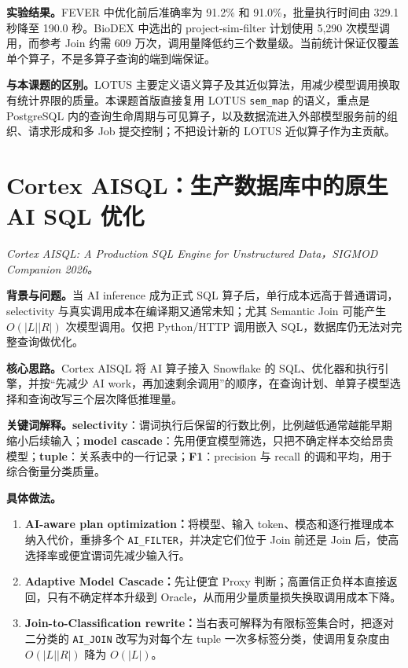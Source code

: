\documentclass[10pt,a4paper]{ctexart}
\let\digestoriginalsection\section
\renewcommand{\section}{\Needspace{7\baselineskip}\digestoriginalsection}
\newcommand{\paperinfo}[1]{\textit{#1}\par}
\newcommand{\field}[1]{\par\noindent\textbf{#1。}\hspace{0.25em}}
\begin{document}
\field{实验结果}FEVER 中优化前后准确率为 91.2\% 和 91.0\%，批量执行时间由 329.1 秒降至 190.0 秒。BioDEX 中选出的 project-sim-filter 计划使用 5,290 次模型调用，而参考 Join 约需 609 万次，调用量降低约三个数量级。当前统计保证仅覆盖单个算子，不是多算子查询的端到端保证。

\field{与本课题的区别}LOTUS 主要定义语义算子及其近似算法，用减少模型调用换取有统计界限的质量。本课题首版直接复用 LOTUS \texttt{sem\_map} 的语义，重点是 PostgreSQL 内的查询生命周期与可见算子，以及数据流进入外部模型服务前的组织、请求形成和多 Job 提交控制；不把设计新的 LOTUS 近似算子作为主贡献。

\section{Cortex AISQL：生产数据库中的原生 AI SQL 优化}
\paperinfo{Cortex AISQL: A Production SQL Engine for Unstructured Data，SIGMOD Companion 2026。}

\field{背景与问题}当 AI inference 成为正式 SQL 算子后，单行成本远高于普通谓词，selectivity 与真实调用成本在编译期又通常未知；尤其 Semantic Join 可能产生 $O(|L||R|)$ 次模型调用。仅把 Python/HTTP 调用嵌入 SQL，数据库仍无法对完整查询做优化。

\field{核心思路}Cortex AISQL 将 AI 算子接入 Snowflake 的 SQL、优化器和执行引擎，并按“先减少 AI work，再加速剩余调用”的顺序，在查询计划、单算子模型选择和查询改写三个层次降低推理量。

\field{关键词解释}\textbf{selectivity}：谓词执行后保留的行数比例，比例越低通常越能早期缩小后续输入；\textbf{model cascade}：先用便宜模型筛选，只把不确定样本交给昂贵模型；\textbf{tuple}：关系表中的一行记录；\textbf{F1}：precision 与 recall 的调和平均，用于综合衡量分类质量。

\field{具体做法}
\begin{enumerate}
  \item \textbf{AI-aware plan optimization：}将模型、输入 token、模态和逐行推理成本纳入代价，重排多个 \texttt{AI\_FILTER}，并决定它们位于 Join 前还是 Join 后，使高选择率或便宜谓词先减少输入行。
  \item \textbf{Adaptive Model Cascade：}先让便宜 Proxy 判断；高置信正负样本直接返回，只有不确定样本升级到 Oracle，从而用少量质量损失换取调用成本下降。
  \item \textbf{Join-to-Classification rewrite：}当右表可解释为有限标签集合时，把逐对二分类的 \texttt{AI\_JOIN} 改写为对每个左 tuple 一次多标签分类，使调用复杂度由 $O(|L||R|)$ 降为 $O(|L|)$。
\end{enumerate}
\end{document}
